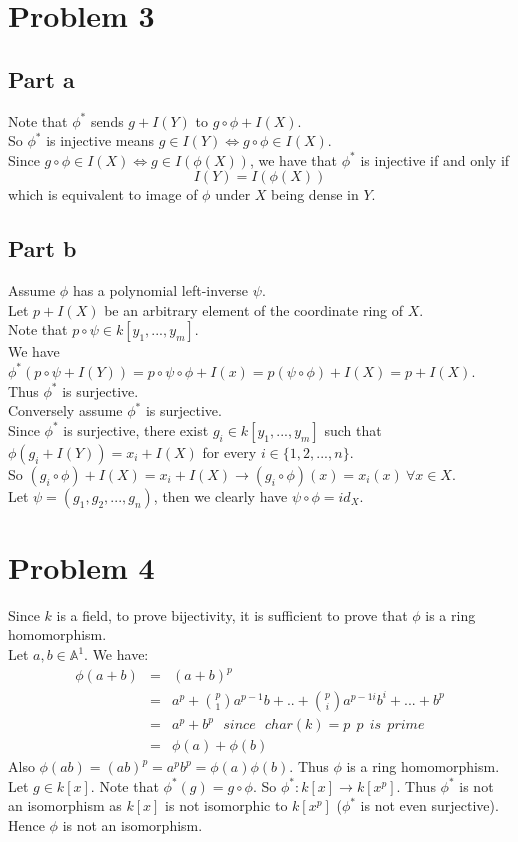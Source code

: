 \documentclass[12pt]{article}
\begin{document}
\clearpage
\section*{Problem 3}
\subsection*{Part a}
Note that $\phi^*$ sends $g+I(Y)$ to $g \circ \phi
+I(X)$.\\ 
So $\phi^*$ is injective means
$g \in I(Y) \Longleftrightarrow g \circ \phi \in I(X)$. \\
Since $g \circ \phi \in I(X) \Longleftrightarrow
g \in I(\phi(X))$, we have that
$\phi^{*}$ is injective if and only if
$$I(Y)=I(\phi(X))$$
which is equivalent to image of $\phi$ under $X$ being dense in $Y$.
\subsection*{Part b}
Assume $\phi$ has a polynomial left-inverse $\psi$. \\
Let $p+I(X)$ be an arbitrary element of the coordinate ring of $X$. \\
Note that $p \circ \psi \in k[y_1,...,y_m]$. \\
We have $\phi^* (p \circ \psi +I(Y)) =
p \circ \psi \circ \phi +I(x) =
p(\psi \circ \phi) +I(X) =p+I(X)$.\\ 
Thus $\phi^*$ is surjective. \\
Conversely assume $\phi^*$ is surjective. \\
Since $\phi^*$ is surjective, there exist $g_i \in k[y_1,...,y_m]$ such that 
$\phi (g_i + I(Y)) = x_i + I(X)$ for every $i \in \{1,2,...,n\}$. \\
So $(g_i \circ \phi) +I(X)=x_i +I(X) \rightarrow (g_i \circ \phi)(x)=x_i(x) \ \forall x \in X$.\\
Let $\psi = (g_1,g_2,...,g_n)$, then we clearly have
$\psi \circ \phi = id_{X}$.



\section*{Problem 4}
Since $k$ is a field, to prove bijectivity, it is sufficient to prove that $\phi$ is a ring homomorphism. \\
Let $a,b \in \mathbb{A}^1$. We have:
\begin{eqnarray*}
\phi(a+b)   &=&   (a+b)^p \\ &=&
a^p+{p \choose 1}a^{p-1}b+..
+{p \choose i}a^{p-1i}b^i+...+b^p
\\ &=&
a^p+b^p \ \ \ since  \ \ \ char(k)=p \ \ p \ \ is \ \ prime
\\ &=&
\phi(a)+\phi(b)
\end{eqnarray*}
Also $\phi(ab)=(ab)^p=a^pb^p=\phi(a)\phi(b)$.
Thus $\phi$ is a ring homomorphism.\\
Let $g \in k[x]$. Note that
$\phi^*(g)=g \circ \phi$. So $\phi^* :k[x] \rightarrow k[x^p]$. Thus $\phi^*$ is not an isomorphism as $k[x]$ is not isomorphic to $k[x^p]$ ($\phi^*$ is not even surjective). Hence $\phi$ is not an isomorphism.
\end{document}
